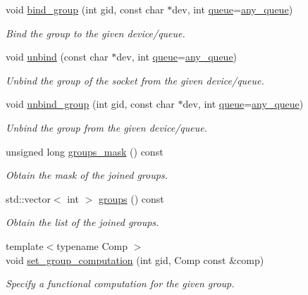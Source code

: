 \begin{DoxyCompactItemize}
void \hyperlink{classnet_1_1pfq_a2b8310320db5d583625d67eaae8be047}{bind\-\_\-group} (int gid, const char $\ast$dev, int \hyperlink{classnet_1_1queue}{queue}=\hyperlink{classnet_1_1pfq_a0d4eca6d0925b7c49365675c9cf9385c}{any\-\_\-queue})
\begin{DoxyCompactList}\small\item\em Bind the group to the given device/queue. \end{DoxyCompactList}\item 
void \hyperlink{classnet_1_1pfq_a769e03c88c5cda30f14e67a7a398aac3}{unbind} (const char $\ast$dev, int \hyperlink{classnet_1_1queue}{queue}=\hyperlink{classnet_1_1pfq_a0d4eca6d0925b7c49365675c9cf9385c}{any\-\_\-queue})
\begin{DoxyCompactList}\small\item\em Unbind the group of the socket from the given device/queue. \end{DoxyCompactList}\item 
void \hyperlink{classnet_1_1pfq_a3bbc9de1354d5cd3e99804e55618a1a3}{unbind\-\_\-group} (int gid, const char $\ast$dev, int \hyperlink{classnet_1_1queue}{queue}=\hyperlink{classnet_1_1pfq_a0d4eca6d0925b7c49365675c9cf9385c}{any\-\_\-queue})
\begin{DoxyCompactList}\small\item\em Unbind the group from the given device/queue. \end{DoxyCompactList}\item 
unsigned long \hyperlink{classnet_1_1pfq_a37b9270cf29bb67a4b4e577646b39a78}{groups\-\_\-mask} () const 
\begin{DoxyCompactList}\small\item\em Obtain the mask of the joined groups. \end{DoxyCompactList}\item 
std\-::vector$<$ int $>$ \hyperlink{classnet_1_1pfq_af63de1f94a492284cfed78695f2e93ec}{groups} () const 
\begin{DoxyCompactList}\small\item\em Obtain the list of the joined groups. \end{DoxyCompactList}\item 
{\footnotesize template$<$typename Comp $>$ }\\void \hyperlink{classnet_1_1pfq_af434441b7c824c81e3888f771b70e023}{set\-\_\-group\-\_\-computation} (int gid, Comp const \&comp)
\begin{DoxyCompactList}\small\item\em Specify a functional computation for the given group. \end{DoxyCompactList}\item 

\end{DoxyCompactItemize}
